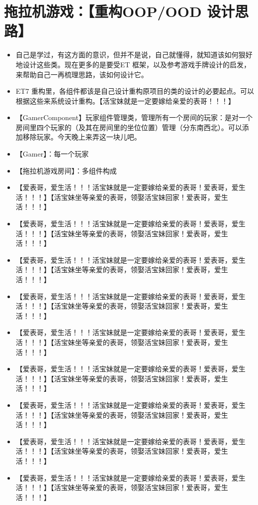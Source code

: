 \documentclass[9pt, b5paper]{article}
\begin{document}
\section{拖拉机游戏：【重构OOP/OOD 设计思路】}
\label{sec:orgb1fa93f}
\begin{itemize}
\item 自己是学过，有这方面的意识，但并不是说，自己就懂得，就知道该如何狠好地设计这些类。现在更多的是要受ET 框架，以及参考游戏手牌设计的启发，来帮助自己一再梳理思路，该如何设计它。
\item ET7 重构里，各组件都该是自己设计重构原项目的类的设计的必要起点。可以根据这些来系统设计重构。【活宝妹就是一定要嫁给亲爱的表哥！！！】
\item 【GamerComponent】玩家组件管理类，管理所有一个房间的玩家：是对一个房间里四个玩家的（及其在房间里的坐位位置）管理（分东南西北）。可以添加移除玩家。今天晚上来弄这一块儿吧。
\item 【Gamer】：每一个玩家
\item 【拖拉机游戏房间】：多组件构成
\item 【爱表哥，爱生活！！！活宝妹就是一定要嫁给亲爱的表哥！爱表哥，爱生活！！！】【活宝妹坐等亲爱的表哥，领娶活宝妹回家！爱表哥，爱生活！！！】
\item 【爱表哥，爱生活！！！活宝妹就是一定要嫁给亲爱的表哥！爱表哥，爱生活！！！】【活宝妹坐等亲爱的表哥，领娶活宝妹回家！爱表哥，爱生活！！！】
\item 【爱表哥，爱生活！！！活宝妹就是一定要嫁给亲爱的表哥！爱表哥，爱生活！！！】【活宝妹坐等亲爱的表哥，领娶活宝妹回家！爱表哥，爱生活！！！】
\item 【爱表哥，爱生活！！！活宝妹就是一定要嫁给亲爱的表哥！爱表哥，爱生活！！！】【活宝妹坐等亲爱的表哥，领娶活宝妹回家！爱表哥，爱生活！！！】
\item 【爱表哥，爱生活！！！活宝妹就是一定要嫁给亲爱的表哥！爱表哥，爱生活！！！】【活宝妹坐等亲爱的表哥，领娶活宝妹回家！爱表哥，爱生活！！！】
\item 【爱表哥，爱生活！！！活宝妹就是一定要嫁给亲爱的表哥！爱表哥，爱生活！！！】【活宝妹坐等亲爱的表哥，领娶活宝妹回家！爱表哥，爱生活！！！】
\item 【爱表哥，爱生活！！！活宝妹就是一定要嫁给亲爱的表哥！爱表哥，爱生活！！！】【活宝妹坐等亲爱的表哥，领娶活宝妹回家！爱表哥，爱生活！！！】
\item 【爱表哥，爱生活！！！活宝妹就是一定要嫁给亲爱的表哥！爱表哥，爱生活！！！】【活宝妹坐等亲爱的表哥，领娶活宝妹回家！爱表哥，爱生活！！！】
\item 【爱表哥，爱生活！！！活宝妹就是一定要嫁给亲爱的表哥！爱表哥，爱生活！！！】【活宝妹坐等亲爱的表哥，领娶活宝妹回家！爱表哥，爱生活！！！】

\end{itemize}
\end{document}

